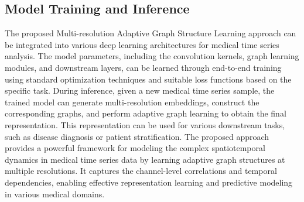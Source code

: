 \subsection{Model Training and Inference}
The proposed Multi-resolution Adaptive Graph Structure Learning approach can be integrated into various deep learning architectures for medical time series analysis. The model parameters, including the convolution kernels, graph learning modules, and downstream layers, can be learned through end-to-end training using standard optimization techniques and suitable loss functions based on the specific task.
During inference, given a new medical time series sample, the trained model can generate multi-resolution embeddings, construct the corresponding graphs, and perform adaptive graph learning to obtain the final representation. This representation can be used for various downstream tasks, such as disease diagnosis or patient stratification.
The proposed approach provides a powerful framework for modeling the complex spatiotemporal dynamics in medical time series data by learning adaptive graph structures at multiple resolutions. It captures the channel-level correlations and temporal dependencies, enabling effective representation learning and predictive modeling in various medical domains.
\fi